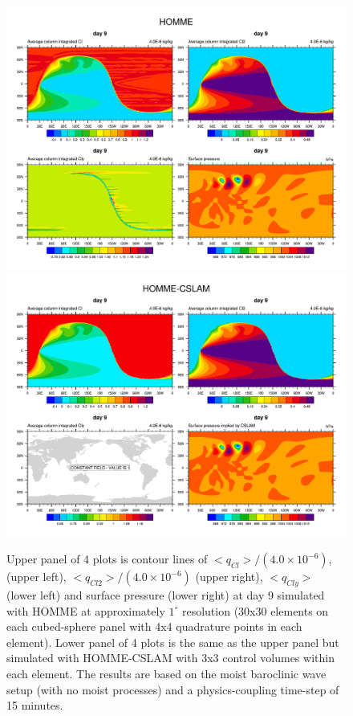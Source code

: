 \documentclass[times,doublespace]{fldauth}
\begin{document}
\begin{figure}[t]
\includegraphics[width=0.9\linewidth]{terminator-2d-se-day9.pdf}
\includegraphics[width=0.9\linewidth]{terminator-2d-cslam-day9.pdf}
\caption{Upper panel of 4 plots is contour lines of $<q_{Cl}>/(4.0\times 10^{-6})$, (upper left), $<q_{Cl2}>/(4.0\times 10^{-6})$ (upper right), $<q_{Cly}>$ (lower left) and surface pressure (lower right) at day 9 simulated with HOMME at approximately $1^\circ$ resolution (30x30 elements on each cubed-sphere panel with 4x4 quadrature points in each element). Lower panel of 4 plots is the same as the upper panel but simulated with HOMME-CSLAM with 3x3 control volumes within each element. The results are based on the moist baroclinic wave setup (with no moist processes) and a physics-coupling time-step of 15 minutes.}
\label{fig:terminator-2d-se}
\end{figure}
\end{document}
